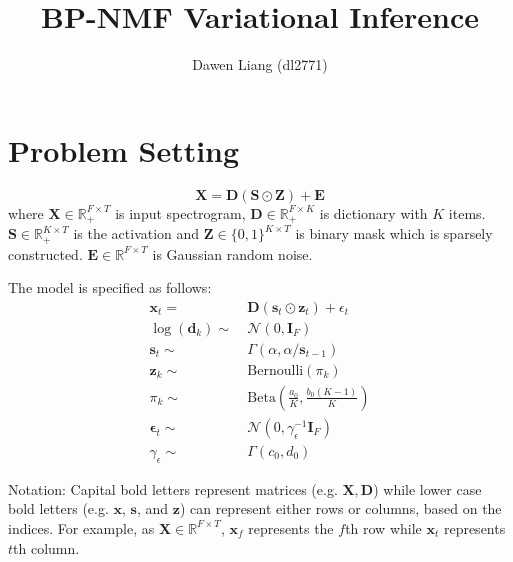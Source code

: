 \documentclass[11pt]{article} %
\title{BP-NMF Variational Inference}
\author{
Dawen Liang (dl2771)
}\date{}                                           %
\begin{document}
\maketitle

\section{Problem Setting}\label{sec:1} 
\[
\mathbf{X} = \mathbf{D} (\mathbf{S} \odot \mathbf{Z}) + \mathbf{E}
\]
where $\mathbf{X} \in \mathbb{R}_+^{F \times T}$ is input spectrogram, $\mathbf{D} \in \mathbb{R}_+^{F \times K}$ is dictionary with $K$ items. $\mathbf{S} \in \mathbb{R}_+^{K \times T}$ is the activation and $\mathbf{Z} \in \{0, 1\}^{K \times T}$ is binary mask which is sparsely constructed. $\mathbf{E} \in \mathbb{R}^{F \times T}$ is Gaussian random noise. 

The model is specified as follows:
\begin{align*}
\boldsymbol{x}_t = &~ \mathbf{D}(\boldsymbol{s}_t \odot \boldsymbol{z}_t) + \epsilon_t\\
\log (\boldsymbol{d}_k) \sim &~ \mathcal{N}(0, \mathbf{I}_F)\\ 
 \boldsymbol{s}_t \sim &~ \Gamma(\alpha, \alpha / \boldsymbol{s}_{t-1})\\
\bm{z}_{k} \sim &~ \textrm{Bernoulli}(\pi_k)\\
\pi_k \sim &~ \textrm{Beta}(\frac{a_0}{K}, \frac{b_0 (K-1)}{K})\\
\bm{\epsilon}_t \sim &~ \mathcal{N}(0, \gamma_\epsilon^{-1} \mathbf{I}_F)\\
\gamma_\epsilon \sim &~ \Gamma(c_0, d_0)
\end{align*}

Notation:
Capital bold letters represent matrices (e.g. $\mathbf{X}, \mathbf{D}$) while lower case bold letters (e.g. $\bm{x}$, $\bm{s}$, and $\bm{z}$) can represent either rows or columns, based on the indices. For example, as $\mathbf{X} \in \mathbb{R}^{F \times T}$, $\bm{x}_f$ represents the $f$th row while $\bm{x}_t$ represents $t$th column.
\end{document}
